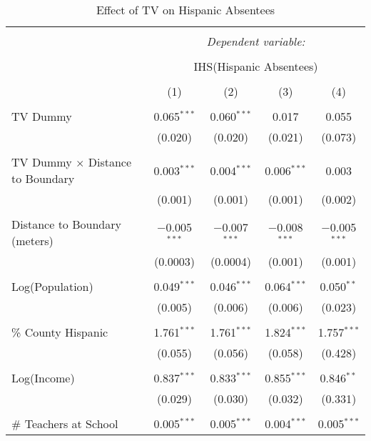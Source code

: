
\begin{table}[!htbp] \centering 
  \caption{Effect of TV on Hispanic Absentees} 
  \label{} 
\begin{tabular}{@{\extracolsep{-2pt}}lcccc} 
\\[-1.8ex]\hline 
\hline \\[-1.8ex] 
 & \multicolumn{4}{c}{\textit{Dependent variable:}} \\ 
\cline{2-5} 
\\[-1.8ex] & \multicolumn{4}{c}{IHS(Hispanic Absentees)} \\ 
\\[-1.8ex] & (1) & (2) & (3) & (4)\\ 
\hline \\[-1.8ex] 
 TV Dummy & 0.065$^{***}$ & 0.060$^{***}$ & 0.017 & 0.055 \\ 
  & (0.020) & (0.020) & (0.021) & (0.073) \\ 
  & & & & \\ 
 TV Dummy $\times$ Distance to Boundary & 0.003$^{***}$ & 0.004$^{***}$ & 0.006$^{***}$ & 0.003 \\ 
  & (0.001) & (0.001) & (0.001) & (0.002) \\ 
  & & & & \\ 
 Distance to Boundary (meters) & $-$0.005$^{***}$ & $-$0.007$^{***}$ & $-$0.008$^{***}$ & $-$0.005$^{***}$ \\ 
  & (0.0003) & (0.0004) & (0.001) & (0.001) \\ 
  & & & & \\ 
 Log(Population) & 0.049$^{***}$ & 0.046$^{***}$ & 0.064$^{***}$ & 0.050$^{**}$ \\ 
  & (0.005) & (0.006) & (0.006) & (0.023) \\ 
  & & & & \\ 
 \% County Hispanic & 1.761$^{***}$ & 1.761$^{***}$ & 1.824$^{***}$ & 1.757$^{***}$ \\ 
  & (0.055) & (0.056) & (0.058) & (0.428) \\ 
  & & & & \\ 
 Log(Income) & 0.837$^{***}$ & 0.833$^{***}$ & 0.855$^{***}$ & 0.846$^{**}$ \\ 
  & (0.029) & (0.030) & (0.032) & (0.331) \\ 
  & & & & \\ 
 \# Teachers at School & 0.005$^{***}$ & 0.005$^{***}$ & 0.004$^{***}$ & 0.005$^{***}$ \\ 

\end{tabular}
\end{table}
